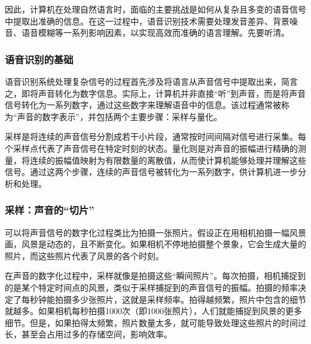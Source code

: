 因此，计算机在处理自然语言时，面临的主要挑战是如何从复杂且多变的语音信号中提取出准确的信息。在这一过程中，语音识别技术需要处理发音差异、背景噪音、语音模糊等一系列影响因素，以实现高效而准确的语言理解。先要听清。

\subsubsection{语音识别的基础}

语音识别系统处理复杂信号的过程首先涉及将语言从声音信号中提取出来，简言之，即将声音转化为数字信息。实际上，计算机并非直接“听”到声音，而是将声音信号转化为一系列数字，通过这些数字来理解语音中的信息。该过程通常被称为“声音的数字表示”，并包括两个主要步骤：采样与量化。

采样是将连续的声音信号分割成若干小片段，通常按时间间隔对信号进行采集。每个采样点代表了声音信号在特定时刻的状态。量化则是对声音的振幅进行精确的测量，将连续的振幅值映射为有限数量的离散值，从而使计算机能够处理并理解这些信号。通过这两个步骤，连续的声音信号被转化为一系列数字，供计算机进一步分析和处理。

\subsubsection{采样：声音的“切片”}

可以将声音信号的数字化过程类比为拍摄一张照片。假设正在用相机拍摄一幅风景画，风景是动态的，且不断变化。如果相机不停地拍摄整个景象，它会生成大量的照片，而这些照片代表了风景的各个时刻。

在声音的数字化过程中，采样就像是拍摄这些“瞬间照片”。每次拍摄，相机捕捉到的是某个特定时间点的风景，类似于采样捕捉到的声音信号的振幅。拍摄的频率决定了每秒钟能拍摄多少张照片，这就是采样频率。拍得越频繁，照片中包含的细节就越多。如果相机每秒拍摄1000次（即1000张照片），人们就能捕捉到风景的更多细节。但是，如果拍得太频繁，照片数量太多，就可能导致处理这些照片的时间过长，甚至会占用过多的存储空间，影响效率。

